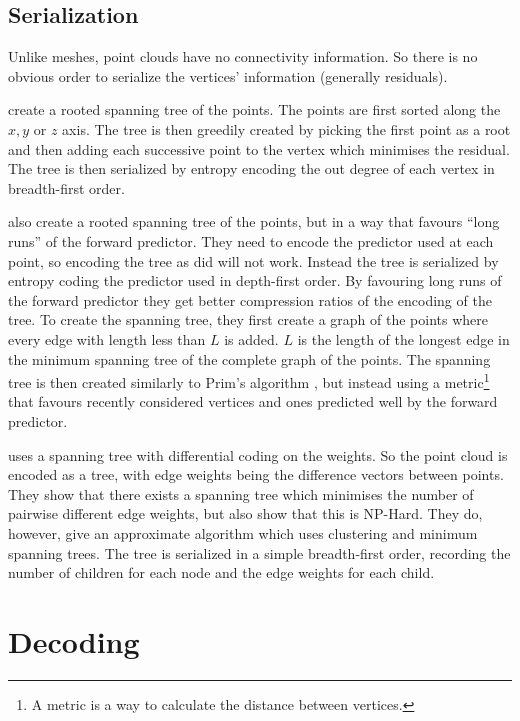 \documentclass{report}
\begin{document}
\subsection{Serialization}
\label{sec:serialization}

Unlike meshes, point clouds have no connectivity information. So there is no
obvious order to serialize the vertices' information (generally residuals).

\citet{gumholdcomp} create a rooted spanning tree of the points. The points
are first sorted along the $x, y$ or $z$ axis. The tree is then greedily
created by picking the first point as a root and then adding each successive
point to the vertex which minimises the residual. The tree is then serialized
by entropy encoding the out degree of each vertex in breadth-first order.

\citet{merrycomp} also create a rooted spanning tree of the points, but in a
way that favours ``long runs'' of the forward predictor. They need to encode
the predictor used at each point, so encoding the tree as \citep{gumholdcomp}
did will not work. Instead the tree is serialized by entropy coding the
predictor used in depth-first order. By favouring long runs of the forward
predictor they get better compression ratios of the encoding of the tree. To
create the spanning tree, they first create a graph of the points where every
edge with length less than $L$ is added. $L$ is the length of the longest edge
in the minimum spanning tree of the complete graph of the points. The spanning
tree is then created similarly to Prim's algorithm \citep[p.\ 457]{sedgewick},
but instead using a metric\footnote{A metric is a way to calculate the
  distance between vertices.} that favours recently considered vertices and
ones predicted well by the forward predictor.

\citet{chen2005lcp} uses a spanning tree with differential coding on the
weights. So the point cloud is encoded as a tree, with edge weights being the
difference vectors between points. They show that there exists a spanning tree
which minimises the number of pairwise different edge weights, but also show
that this is NP-Hard. They do, however, give an approximate algorithm which
uses clustering and minimum spanning trees. The tree is serialized in a simple
breadth-first order, recording the number of children for each node and the
edge weights for each child.


\section{Decoding}
\end{document}
